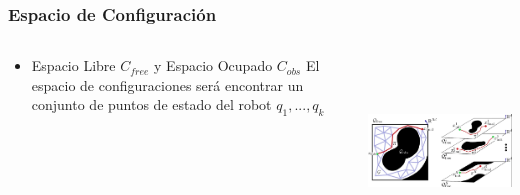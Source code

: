 \documentclass[
	11pt, %
]{beamer}
\begin{document}


\begin{frame}
  \frametitle{Espacio de Configuraci\'{o}n}
  \setlength{\leftmargini}{0.5em}
  \begin{columns}[c, onlytextwidth]%
    \begin{column}{.5\textwidth}%
      \setlength{\partopsep}{0pt}%
      \begin{itemize}
        \itemsep 1.5em
      \item Espacio Libre $C_{free}$ y Espacio Ocupado $C_{obs}$
        El espacio de configuraciones será encontrar un conjunto de puntos de estado del robot $q_{1},...,q_{k}$\\
      \end{itemize}
    \end{column}%
    \begin{column}{.45\textwidth}
      \begin{center}
        \includegraphics[width=\textwidth, height=5cm]{path2}
      \end{center}
    \end{column}%
\end{columns}
\end{frame}
\end{document}

